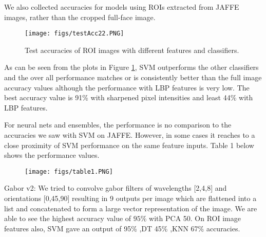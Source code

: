 \documentclass[10pt,twocolumn,letterpaper]{article}
\begin{document}
We also collected accuracies for models using ROIs extracted from JAFFE images, rather than the cropped full-face image. 
\begin{figure}[h]
\texttt{[image: figs/testAcc22.PNG]}
\caption{Test accuracies of ROI images with different features and classifiers.}
\label{fig:testacc2}
\end{figure}

As can be seen from the plots in Figure \ref{fig:testacc2}, SVM outperforms the other classifiers and the over all performance matches or is consistently better than the full image accuracy values although the performance with LBP features is very low. The best accuracy value is 91\% with sharpened pixel intensities and least 44\% with LBP features. 

For neural nets and ensembles, the performance is no comparison to the accuracies we saw with SVM on JAFFE. However, in some cases it reaches to a close proximity of SVM performance on the same feature inputs. Table 1 below shows the performance values.

\begin{figure}[h]
\texttt{[image: figs/table1.PNG]}
\label{fig:testacc4}
\end{figure}
%

Gabor v2: We tried to convolve gabor filters of wavelengths [2,4,8] and orientations [0,45,90] resulting in 9 outputs per image which are flattened into a list and concatenated to form a large vector representation of the image. We are able to see the highest accuracy value of $95\%$ with PCA 50.
On ROI image features also, SVM gave an output of 95\% ,DT 45\% ,KNN 67\% accuracies.  
\end{document}
